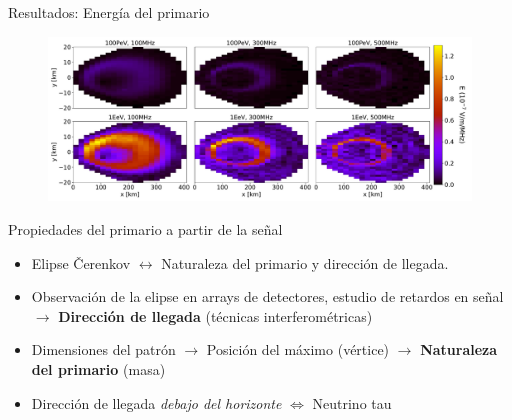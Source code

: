 \documentclass{beamer}
\begin{document}
\begin{frame}{Resultados: Energía del primario}
		\begin{figure}[H]
		\centering
		\includegraphics[width=1\linewidth]{figures/Radio_UG/85deg_varE}

	\end{figure}
\end{frame}

\begin{frame}{Propiedades del primario a partir de la señal}
	\begin{itemize}
		\item Elipse \v{C}erenkov $\leftrightarrow$ Naturaleza del primario y dirección de llegada.
		\item Observación de la elipse en arrays de detectores, estudio de retardos en señal $\rightarrow$ \textbf{Dirección de llegada} (técnicas interferométricas)
		\item Dimensiones del patrón $\rightarrow$ Posición del máximo (vértice) $\rightarrow$ \textbf{Naturaleza del primario} (masa)
		\item Dirección de llegada \textit{debajo del horizonte} $\Longleftrightarrow$ Neutrino tau
	\end{itemize}
\end{frame}
\end{document}
